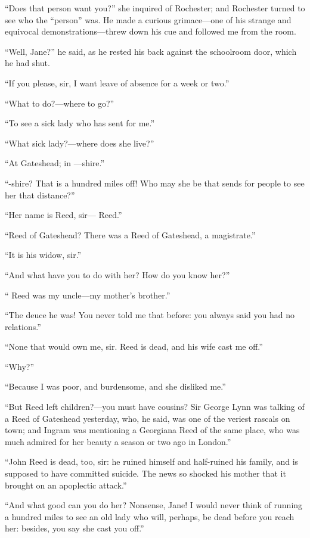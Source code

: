 \enquote{Does that person want you?} she inquired of \Mr{} Rochester; and
\Mr{} Rochester turned to see who the \enquote{person} was. He made a
curious grimace---one of his strange and equivocal
demonstrations---threw down his cue and followed me from the room.

\enquote{Well, Jane?} he said, as he rested his back against the
schoolroom door, which he had shut.

\enquote{If you please, sir, I want leave of absence for a week or two.}

\enquote{What to do?---where to go?}

\enquote{To see a sick lady who has sent for me.}

\enquote{What sick lady?---where does she live?}

\enquote{At Gateshead; in ---shire.}

\enquote{-shire? That is a hundred miles off! Who may she be that
	sends for people to see her that distance?}

\enquote{Her name is Reed, sir---\Mrs{} Reed.}

\enquote{Reed of Gateshead? There was a Reed of Gateshead, a
	magistrate.}

\enquote{It is his widow, sir.}

\enquote{And what have you to do with her? How do you know her?}

\enquote{\Mr{} Reed was my uncle---my mother's brother.}

\enquote{The deuce he was! You never told me that before: you always
	said you had no relations.}

\enquote{None that would own me, sir. \Mr{} Reed is dead, and his wife
	cast me off.}

\enquote{Why?}

\enquote{Because I was poor, and burdensome, and she disliked me.}

\enquote{But Reed left children?---you must have cousins? Sir George
	Lynn was talking of a Reed of Gateshead yesterday, who, he said, was one
	of the veriest rascals on town; and Ingram was mentioning a Georgiana
	Reed of the same place, who was much admired for her beauty a season or
	two ago in London.}

\enquote{John Reed is dead, too, sir: he ruined himself and half-ruined
	his family, and is supposed to have committed suicide. The news so
	shocked his mother that it brought on an apoplectic attack.}

\enquote{And what good can you do her? Nonsense, Jane! I would never
	think of running a hundred miles to see an old lady who will, perhaps,
	be dead before you reach her: besides, you say she cast you off.}


